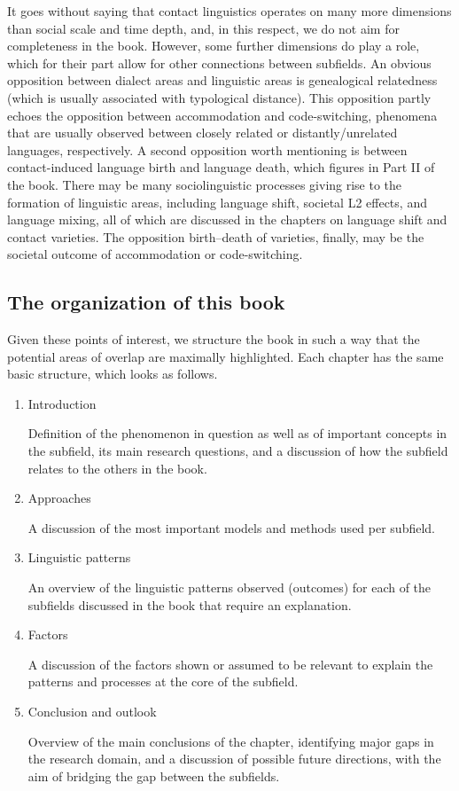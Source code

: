 It goes without saying that contact linguistics operates on many more dimensions than social scale and time depth, and, in this respect, we do not aim for completeness in the book. However, some further dimensions do play a role, which for their part allow for other connections between subfields. An obvious opposition between dialect areas and linguistic areas is genealogical relatedness (which is usually associated with typological distance). This opposition partly echoes the opposition between accommodation and code-switching, phenomena that are usually observed between closely related or distantly/unrelated languages, respectively. A second opposition worth mentioning is between contact-induced language birth and language death, which figures in Part II of the book. There may be many sociolinguistic processes giving rise to the formation of linguistic areas, including language shift, societal L2 effects, and language mixing, all of which are discussed in the chapters on language shift and contact varieties. The opposition birth–death of varieties, finally, may be the societal outcome of accommodation or code-switching.


\subsection{The organization of this book}

Given these points of interest, we structure the book in such a way that  the potential areas of overlap are maximally highlighted. Each chapter has the same basic structure, which looks as follows.

\begin{enumerate}
\item Introduction

Definition of the phenomenon in question as well as of important concepts in the subfield, its main research questions, and a discussion of how the subfield relates to the others in the book.

\item Approaches

A discussion of the most important models and methods used per subfield.

\item Linguistic patterns

An overview of the linguistic patterns observed (outcomes) for each of the subfields discussed in the book that require an explanation.

\item Factors

A discussion of the factors shown or assumed to be relevant to explain the patterns and processes at the core of the subfield.

\item Conclusion and outlook

Overview of the main conclusions of the chapter, identifying major gaps in the research domain, and a discussion of possible future directions, with the aim of bridging the gap between the subfields.
\end{enumerate}

